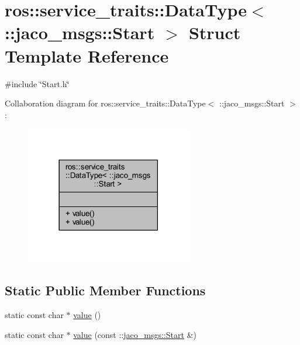 \hypertarget{structros_1_1service__traits_1_1DataType_3_01_1_1jaco__msgs_1_1Start_01_4}{}\section{ros\+:\+:service\+\_\+traits\+:\+:Data\+Type$<$ \+:\+:jaco\+\_\+msgs\+:\+:Start $>$ Struct Template Reference}
\label{structros_1_1service__traits_1_1DataType_3_01_1_1jaco__msgs_1_1Start_01_4}


{\ttfamily \#include \char`\"{}Start.\+h\char`\"{}}



Collaboration diagram for ros\+:\+:service\+\_\+traits\+:\+:Data\+Type$<$ \+:\+:jaco\+\_\+msgs\+:\+:Start $>$\+:
\nopagebreak
\begin{figure}[H]
\begin{center}
\leavevmode
\includegraphics[width=206pt]{dd/d4a/structros_1_1service__traits_1_1DataType_3_01_1_1jaco__msgs_1_1Start_01_4__coll__graph}
\end{center}
\end{figure}
\subsection*{Static Public Member Functions}
\begin{DoxyCompactItemize}
\item 
static const char $\ast$ \hyperlink{structros_1_1service__traits_1_1DataType_3_01_1_1jaco__msgs_1_1Start_01_4_a209952e5aa02dc377d6b090996a46c2d}{value} ()
\item 
static const char $\ast$ \hyperlink{structros_1_1service__traits_1_1DataType_3_01_1_1jaco__msgs_1_1Start_01_4_a76a75bb7b1d49fcbdda5a559f4a59c1f}{value} (const \+::\hyperlink{namespacejaco__msgs_d8/d46/structjaco__msgs_1_1Start}{jaco\+\_\+msgs\+::\+Start} \&)
\end{DoxyCompactItemize}



